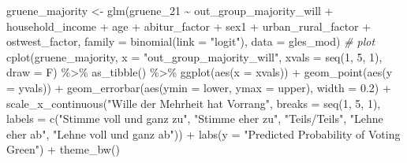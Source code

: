 \documentclass[
]{article}
\newenvironment{Shaded}{\begin{snugshade}}{\end{snugshade}}
\newcommand{\AttributeTok}[1]{\textcolor[rgb]{0.77,0.63,0.00}{#1}}
\newcommand{\CommentTok}[1]{\textcolor[rgb]{0.56,0.35,0.01}{\textit{#1}}}
\newcommand{\DecValTok}[1]{\textcolor[rgb]{0.00,0.00,0.81}{#1}}
\newcommand{\FloatTok}[1]{\textcolor[rgb]{0.00,0.00,0.81}{#1}}
\newcommand{\FunctionTok}[1]{\textcolor[rgb]{0.00,0.00,0.00}{#1}}
\newcommand{\NormalTok}[1]{#1}
\newcommand{\OtherTok}[1]{\textcolor[rgb]{0.56,0.35,0.01}{#1}}
\newcommand{\SpecialCharTok}[1]{\textcolor[rgb]{0.00,0.00,0.00}{#1}}
\newcommand{\StringTok}[1]{\textcolor[rgb]{0.31,0.60,0.02}{#1}}
\begin{document}
\begin{Shaded}
\begin{Highlighting}[]
\NormalTok{gruene\_majority }\OtherTok{\textless{}{-}} \FunctionTok{glm}\NormalTok{(gruene\_21 }\SpecialCharTok{\textasciitilde{}}\NormalTok{ out\_group\_majority\_will }\SpecialCharTok{+}\NormalTok{ household\_income }\SpecialCharTok{+}\NormalTok{ age }\SpecialCharTok{+}\NormalTok{ abitur\_factor }\SpecialCharTok{+}\NormalTok{ sex1 }\SpecialCharTok{+}\NormalTok{ urban\_rural\_factor }\SpecialCharTok{+}\NormalTok{ ostwest\_factor, }\AttributeTok{family =} \FunctionTok{binomial}\NormalTok{(}\AttributeTok{link =} \StringTok{"logit"}\NormalTok{), }\AttributeTok{data =}\NormalTok{ gles\_mod)}
\CommentTok{\# plot }
\FunctionTok{cplot}\NormalTok{(gruene\_majority, }\AttributeTok{x =} \StringTok{"out\_group\_majority\_will"}\NormalTok{, }
      \AttributeTok{xvals =} \FunctionTok{seq}\NormalTok{(}\DecValTok{1}\NormalTok{, }\DecValTok{5}\NormalTok{, }\DecValTok{1}\NormalTok{), }\AttributeTok{draw =}\NormalTok{ F) }\SpecialCharTok{\%\textgreater{}\%}
  \FunctionTok{as\_tibble}\NormalTok{() }\SpecialCharTok{\%\textgreater{}\%}
  \FunctionTok{ggplot}\NormalTok{(}\FunctionTok{aes}\NormalTok{(}\AttributeTok{x =}\NormalTok{ xvals)) }\SpecialCharTok{+}
  \FunctionTok{geom\_point}\NormalTok{(}\FunctionTok{aes}\NormalTok{(}\AttributeTok{y =}\NormalTok{ yvals)) }\SpecialCharTok{+}
  \FunctionTok{geom\_errorbar}\NormalTok{(}\FunctionTok{aes}\NormalTok{(}\AttributeTok{ymin =}\NormalTok{ lower, }\AttributeTok{ymax =}\NormalTok{ upper), }\AttributeTok{width =} \FloatTok{0.2}\NormalTok{) }\SpecialCharTok{+}
  \FunctionTok{scale\_x\_continuous}\NormalTok{(}\StringTok{"Wille der Mehrheit hat Vorrang"}\NormalTok{, }
                     \AttributeTok{breaks =} \FunctionTok{seq}\NormalTok{(}\DecValTok{1}\NormalTok{, }\DecValTok{5}\NormalTok{, }\DecValTok{1}\NormalTok{),}
                     \AttributeTok{labels =} \FunctionTok{c}\NormalTok{(}\StringTok{"Stimme voll und ganz zu"}\NormalTok{, }\StringTok{"Stimme eher zu"}\NormalTok{, }
                                \StringTok{"Teils/Teils"}\NormalTok{, }\StringTok{"Lehne eher ab"}\NormalTok{, }
                                \StringTok{"Lehne voll und ganz ab"}\NormalTok{)) }\SpecialCharTok{+}
  \FunctionTok{labs}\NormalTok{(}\AttributeTok{y =} \StringTok{"Predicted Probability of Voting Green"}\NormalTok{) }\SpecialCharTok{+}
  \FunctionTok{theme\_bw}\NormalTok{()}
\end{Highlighting}
\end{Shaded}
\end{document}
